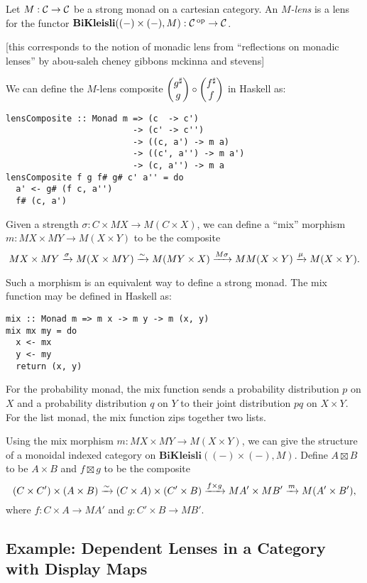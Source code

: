 \begin{defn}
Let $M : \operatorname{\mathcal{C}} \to \operatorname{\mathcal{C}}$ be a strong monad on a cartesian category. An
\emph{$M$-lens} is a lens for the functor $\textbf{BiKleisli}((-) \times (-), M)
: \operatorname{\mathcal{C}}\operatorname{^\text{op}} \to \operatorname{\mathcal{C}}$.
\end{defn}
[this corresponds to the notion of monadic lens from ``reflections on monadic
lenses'' by abou-saleh cheney gibbons mckinna and stevens]

We can define the $M$-lens composite $\begin{pmatrix}{g^{\sharp}} \\ {g} \end{pmatrix} \circ \begin{pmatrix}{f^{\sharp}} \\ {f} \end{pmatrix}$ in Haskell as:
\begin{verbatim}
lensComposite :: Monad m => (c  -> c')
                         -> (c' -> c'')
                         -> ((c, a') -> m a) 
                         -> ((c', a'') -> m a') 
                         -> (c, a'') -> m a
lensComposite f g f# g# c' a'' = do
  a' <- g# (f c, a'')
  f# (c, a')
\end{verbatim}

Given a strength $\sigma : C \times MX \to M(C \times X)$, we can define a
``mix'' morphism $m : MX \times M Y \to M(X \times Y)$ to be the composite
$$MX \times MY \xrightarrow{\sigma} M(X \times MY) \xrightarrow{\sim} M(MY \times X)
\xrightarrow{M\sigma} MM(X \times Y) \xrightarrow{\mu} M(X \times Y).$$

Such a morphism is an equivalent way to define a strong monad. The mix function
may be defined in Haskell as:
\begin{verbatim}
mix :: Monad m => m x -> m y -> m (x, y)
mix mx my = do
  x <- mx
  y <- my
  return (x, y)
\end{verbatim}
For the probability monad, the mix function sends a probability distribution $p$
on $X$ and a probability distribution $q$ on $Y$ to their joint distribution
$pq$ on $X \times Y$. For the list monad, the mix function zips together two
lists. 

Using the mix morphism $m : MX \times MY \to M(X \times Y)$, we can give the
structure of a monoidal indexed category on $\textbf{BiKleisli}((-) \times (-),
M)$. Define $A \boxtimes B$ to be $A \times B$ and $f \boxtimes g$ to be the
composite
$$(C \times C') \times (A \times B) \xrightarrow{\sim} (C \times A) \times (C' \times B)
\xrightarrow{f \times g} M A' \times M B' \xrightarrow{m} M(A' \times B'),$$
where $f : C \times A \to M A'$ and $g : C' \times B \to M B'$. 


\subsection{Example: Dependent Lenses in a Category with Display Maps}

